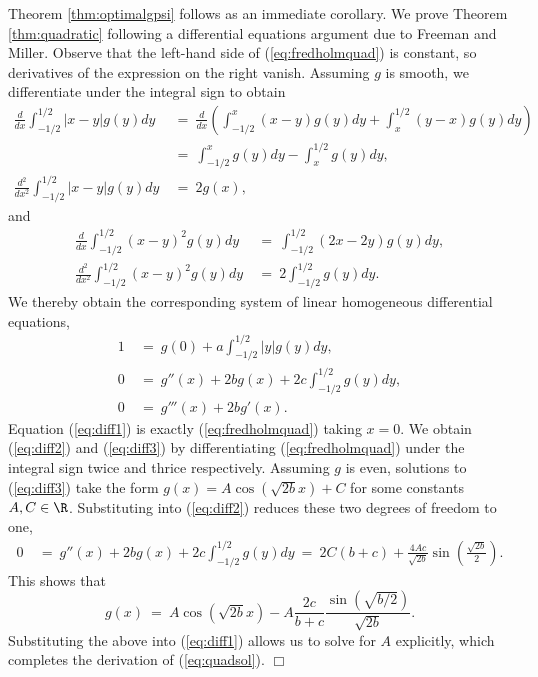 \documentclass[12pt, reqno]{amsart}
\numberwithin{equation}{section}
\theoremstyle{definition}
\theoremstyle{remark}
\begin{document}
Theorem \ref{thm:optimalgpsi} follows as an immediate corollary. We prove Theorem \ref{thm:quadratic} following a differential equations argument due to Freeman and Miller. Observe that the left-hand side of (\ref{eq:fredholmquad}) is constant, so derivatives of the expression on the right vanish. Assuming $g$ is smooth, we differentiate under the integral sign to obtain
\begin{align*}
		\frac{d}{dx}  \int_{-1/2}^{1/2} |x - y| g(y) dy
			&\ = \ \frac{d}{dx} \left( \int_{-1/2}^x (x - y) g(y) dy +  \int_x^{1/2} (y - x) g(y) dy \right)\\
			&\ = \  \int_{-1/2}^x g(y) dy - \int_x^{1/2} g(y) dy, \\
		\frac{d^2}{dx^2}  \int_{-1/2}^{1/2} |x - y| g(y) dy
			&\ = \  2g(x),
	\end{align*}
and
	\begin{align*}
		\frac{d}{dx} \int_{-1/2}^{1/2} (x - y)^2 g(y) dy
			&\ = \  \int_{-1/2}^{1/2} (2x - 2y) g(y) dy, \\
		\frac{d^2}{dx^2} \int_{-1/2}^{1/2} (x - y)^2 g(y) dy
			&\ = \  2 \int_{-1/2}^{1/2} g(y) dy.
	\end{align*}
We thereby obtain the corresponding system of linear homogeneous differential equations,
	\begin{align}
		1
			&\ = \  g(0) + a \int_{-1/2}^{1/2} |y| g(y) dy, \label{eq:diff1}\\
		0
			&\ = \  g'' (x) + 2b g(x) + 2c \int_{-1/2}^{1/2} g(y) dy, \label{eq:diff2} \\
		0
			&\ = \  g''' (x) + 2b g'(x).		\label{eq:diff3}	
	\end{align}
Equation (\ref{eq:diff1}) is exactly (\ref{eq:fredholmquad}) taking $x = 0$. We obtain (\ref{eq:diff2}) and (\ref{eq:diff3}) by differentiating (\ref{eq:fredholmquad}) under the integral sign twice and thrice respectively. Assuming $g$ is even, solutions to (\ref{eq:diff3}) take the form $g(x) = A \cos(\sqrt{2b} x) + C$ for some constants $A, C \in \R$. Substituting into (\ref{eq:diff2}) reduces these two degrees of freedom to one,
	\begin{align}
		0
			&\ = \  g'' (x) + 2b g(x) + 2c \int_{-1/2}^{1/2} g(y) dy \ = \  2C (b + c) + \frac{4A c}{\sqrt{2b}} \sin\left( \frac{\sqrt{2b}}{2} \right).
	\end{align}
	This shows that
	\begin{equation}
		 g(x) \ = \  A\cos(\sqrt{2b} x) - A\frac{2c}{b + c} \frac{\sin\left( \sqrt{b/2} \right)}{\sqrt{2b}}.
	\end{equation}
	Substituting the above into (\ref{eq:diff1}) allows us to solve for $A$ explicitly, which completes the derivation of (\ref{eq:quadsol}). \hfill $\Box$
\end{document}
